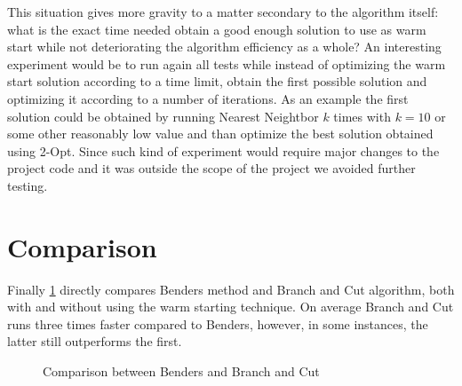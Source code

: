 This situation gives more gravity to a matter secondary to the algorithm itself: what is the exact time needed obtain a good enough solution to use as warm start while not deteriorating the algorithm efficiency as a whole?
An interesting experiment would be to run again all tests while instead of optimizing the warm start solution according to a time limit, obtain the first possible solution and optimizing it according to a number of iterations.
As an example the first solution could be obtained by running Nearest Neightbor $k$ times with $k=10$ or some other reasonably low value and than optimize the best solution obtained using 2-Opt.
Since such kind of experiment would require major changes to the project code and it was outside the scope of the project we avoided further testing. 

\section{Comparison}	
Finally \figurename{ \ref{fig:bendersBranchCut}} directly compares Benders method and Branch and Cut algorithm, both with and without using the warm starting technique.
On average Branch and Cut runs three times faster compared to Benders, however, in some instances, the latter still outperforms the first.

\begin{figure}[htbp]
	\centering
	\caption{Comparison between Benders and Branch and Cut\label{fig:bendersBranchCut}}
\end{figure}